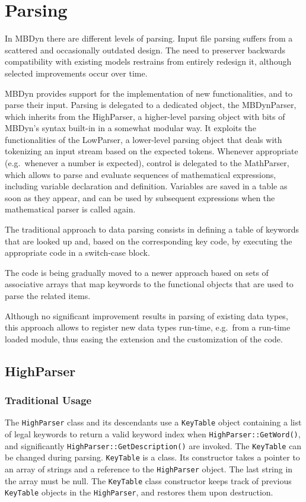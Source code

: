 \documentclass[10pt,dvips,fleqn,subeqn]{report}
\begin{document}
\chapter{Parsing}
In MBDyn there are different levels of parsing.
Input file parsing suffers from a scattered and occasionally outdated design.
The need to preserver backwards compatibility with existing models
restrains from entirely redesign it, although selected improvements
occur over time.

MBDyn provides support for the implementation of new functionalities,
and to parse their input.
Parsing is delegated to a dedicated object, the MBDynParser, which
inherits from the HighParser, a higher-level parsing object 
with bits of MBDyn's syntax built-in in a somewhat modular way.
It exploits the functionalities of the LowParser, a lower-level
parsing object that deals with tokenizing an input stream
based on the expected tokens.
Whenever appropriate (e.g.\ whenever a number is expected),
control is delegated to the MathParser, which allows to parse and evaluate
sequences of mathematical expressions, including variable declaration
and definition.
Variables are saved in a table as soon as they appear, and can be
used by subsequent expressions when the mathematical parser is called again.

The traditional approach to data parsing consists in defining a table
of keywords that are looked up and, based on the corresponding key code,
by executing the appropriate code in a switch-case block.

The code is being gradually moved to a newer approach based on sets
of associative arrays that map keywords to the functional objects
that are used to parse the related items.

Although no significant improvement results in parsing of existing 
data types, this approach allows to register new data types run-time,
e.g.\ from a run-time loaded module, thus easing the extension
and the customization of the code.


\section{HighParser}
\subsection{Traditional Usage}
The \texttt{HighParser} class and its descendants use a \texttt{KeyTable}
object containing a list of legal keywords to return a valid keyword index
when \texttt{HighParser::GetWord()}, and significantly 
\texttt{HighParser::GetDescription()} are invoked.
The \texttt{KeyTable} can be changed during parsing.
\texttt{KeyTable} is a class.
Its constructor takes a pointer to an array of strings and a reference 
to the \texttt{HighParser} object.
The last string in the array must be null.
The \texttt{KeyTable} class constructor keeps track 
of previous \texttt{KeyTable} objects in the \texttt{HighParser}, 
and restores them upon destruction.
\end{document}
